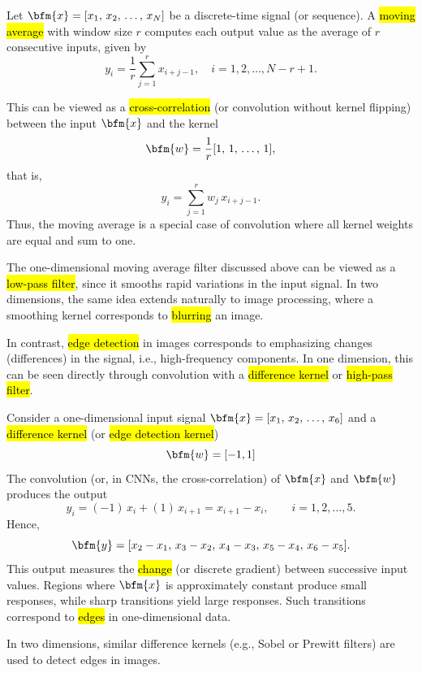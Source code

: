 \begin{example}
Let 
$
\bfm{x} = [x_1,\, x_2,\, \ldots,\, x_N]
$
be a discrete-time signal (or sequence).  
A \hl{moving average} with window size $r$ computes each output value as the average of $r$ consecutive inputs, given by
$$
y_i = \frac{1}{r}\sum_{j=1}^{r} x_{i+j-1},
\quad i = 1, 2, \ldots, N - r + 1.
$$

This can be viewed as a \hl{cross-correlation} (or convolution without kernel flipping) between the input $\bfm{x}$ and the kernel
$$
\bfm{w} = \frac{1}{r}[1,\, 1,\, \ldots,\, 1],
$$
that is,
$$
y_i = \sum_{j=1}^{r} w_j\, x_{i+j-1}.
$$
Thus, the moving average is a special case of convolution where all kernel weights are equal and sum to one.
\end{example}
The one-dimensional moving average filter discussed above can be viewed as a \hl{low-pass filter}, since it smooths rapid variations in the input signal. In two dimensions, the same idea extends naturally to image processing, where a smoothing kernel corresponds to \hl{blurring} an image. 

In contrast, \hl{edge detection} in images corresponds to emphasizing changes (differences) in the signal, i.e., high-frequency components.
In one dimension, this can be seen directly through convolution with a \hl{difference kernel} or \hl{high-pass filter}.
\begin{example}

Consider a one-dimensional input signal
$
\bfm{x} = [x_1,\, x_2,\, \ldots,\, x_6]
$
and a \hl{difference kernel} (or \hl{edge detection kernel})
$$
\bfm{w} = [-1, 1]
$$
The convolution (or, in CNNs, the cross-correlation) of $\bfm{x}$ and $\bfm{w}$ produces the output
$$
y_i = (-1)\,x_i + (1)\,x_{i+1} = x_{i+1} - x_i, 
\qquad i = 1, 2, \ldots, 5.
$$
Hence,
$$
\bfm{y} = [x_2 - x_1,\, x_3 - x_2,\, x_4 - x_3,\, x_5 - x_4,\, x_6 - x_5].
$$
This output measures the \hl{change} (or discrete gradient) between successive input values.
Regions where $\bfm{x}$ is approximately constant produce small responses, while sharp transitions yield large responses.  Such transitions correspond to \hl{edges} in one-dimensional data.

In two dimensions, similar difference kernels (e.g., Sobel or Prewitt filters) are used to detect edges in images.
\end{example}
